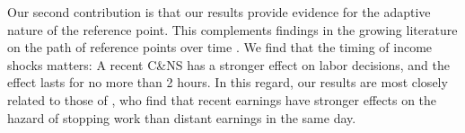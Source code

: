 \documentclass[reviewmode,AEJ]{AEA}
\begin{document}
%
%

Our second contribution is that our results provide evidence for the adaptive nature
of the reference point. This complements findings in the growing literature on the path of reference points
over time \citep{dellavigna2017reference,thakral2018daily}. We find that the timing of income shocks matters:
A recent C\&NS has a stronger effect on labor decisions, and the effect lasts for no more than 2 hours. 
In this regard, our results are most closely related to those of \citet{thakral2018daily}, who find that 
recent earnings have stronger effects on the hazard of stopping work than distant earnings in the same day.
\end{document}
